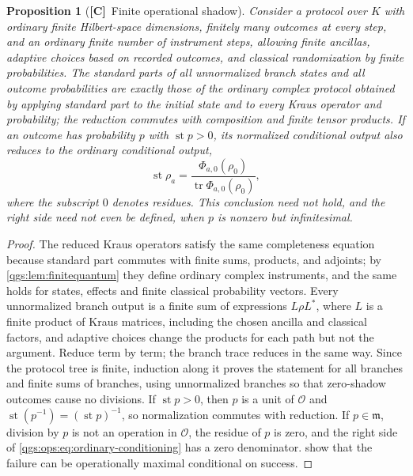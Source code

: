 \documentclass[11pt,oneside]{article}
\numberwithin{equation}{section}
\theoremstyle{plain}
\newtheorem{proposition}[proposition]{Proposition}
\theoremstyle{definition}
\theoremstyle{remark}
\newcommand{\OO}{\mathcal O}
\newcommand{\mm}{\mathfrak m}
\DeclareMathOperator{\st}{st}
\DeclareMathOperator{\tr}{tr}
\newcommand{\TC}{\textcolor{TierC}{\textsf{\bfseries[C]}}}
\begin{document}
\begin{proposition}[\TC\ Finite operational shadow]\label{qgs:prop:shadow}
Consider a protocol over $K$ with ordinary finite Hilbert-space dimensions, finitely many outcomes at every step, and an ordinary finite number of instrument steps, allowing finite ancillas, adaptive choices based on recorded outcomes, and classical randomization by finite probabilities. The standard parts of all \emph{unnormalized} branch states and all outcome probabilities are exactly those of the ordinary complex protocol obtained by applying standard part to the initial state and to every Kraus operator and probability; the reduction commutes with composition and finite tensor products. If an outcome has probability $p$ with $\st p>0$, its normalized conditional output also reduces to the ordinary conditional output,
\begin{equation}\label{qgs:ops:eq:ordinary-conditioning}
 \st\rho_a=\frac{\Phi_{a,0}(\rho_0)}{\tr\Phi_{a,0}(\rho_0)},
\end{equation}
where the subscript $0$ denotes residues. This conclusion need not hold, and the right side need not even be defined, when $p$ is nonzero but infinitesimal.
\end{proposition}
\begin{proof}
The reduced Kraus operators satisfy the same completeness equation because standard part commutes with finite sums, products, and adjoints; by \cref{qgs:lem:finitequantum} they define ordinary complex instruments, and the same holds for states, effects and finite classical probability vectors. Every unnormalized branch output is a finite sum of expressions $L\rho L^*$, where $L$ is a finite product of Kraus matrices, including the chosen ancilla and classical factors, and adaptive choices change the products for each path but not the argument. Reduce term by term; the branch trace reduces in the same way. Since the protocol tree is finite, induction along it proves the statement for all branches and finite sums of branches, using unnormalized branches so that zero-shadow outcomes cause no divisions. If $\st p>0$, then $p$ is a unit of $\OO$ and $\st(p^{-1})=(\st p)^{-1}$, so normalization commutes with reduction. If $p\in\mm$, division by $p$ is not an operation in $\OO$, the residue of $p$ is zero, and the right side of \eqref{qgs:ops:eq:ordinary-conditioning} has a zero denominator.  show that the failure can be operationally maximal conditional on success.
\end{proof}
\end{document}
